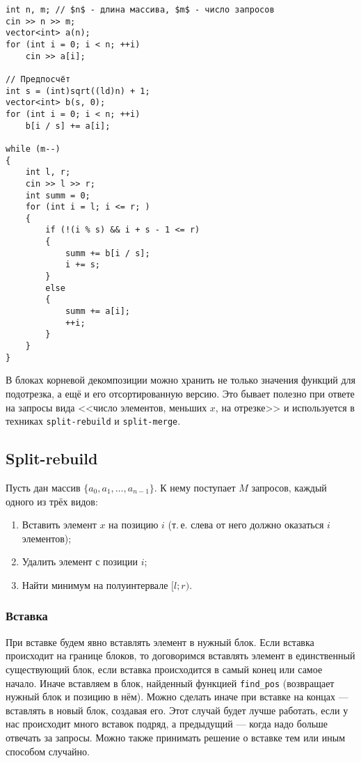 \begin{verbatim}
int n, m; // $n$ - длина массива, $m$ - число запросов
cin >> n >> m;
vector<int> a(n);
for (int i = 0; i < n; ++i)
    cin >> a[i];

// Предпосчёт
int s = (int)sqrt((ld)n) + 1;
vector<int> b(s, 0);
for (int i = 0; i < n; ++i)
    b[i / s] += a[i];

while (m--)
{
    int l, r;
    cin >> l >> r;
    int summ = 0;
    for (int i = l; i <= r; )
    {
        if (!(i % s) && i + s - 1 <= r)
        {
            summ += b[i / s];
            i += s;
        }
        else
        {
            summ += a[i];
            ++i;
        }
    }
}
\end{verbatim}

В блоках корневой декомпозиции можно хранить не только значения функций для подотрезка, а ещё и его отсортированную версию. Это бывает полезно при ответе на запросы вида <<число элементов, меньших $x$, на отрезке>> и используется в техниках \texttt{split-rebuild} и \texttt{split-merge}.

\subsection{Split-rebuild}

\begin{problem}
    Пусть дан массив $\{a_0, a_1, \ldots, a_{n - 1}\}$. К нему поступает $M$ запросов, каждый одного из трёх видов:

    \begin{enumerate}[nolistsep]
        \item Вставить элемент $x$ на позицию $i$ (т.\,е. слева от него должно оказаться $i$ элементов);
        \item Удалить элемент с позиции $i$;
        \item Найти минимум на полуинтервале $[l; r)$.
    \end{enumerate}
\end{problem}

\subsubsection{Вставка}

При вставке будем явно вставлять элемент в нужный блок. Если вставка происходит на границе блоков, то договоримся вставлять элемент в единственный существующий блок, если вставка происходится в самый конец или самое начало. Иначе вставляем в блок, найденный функцией \texttt{find\_pos} (возвращает нужный блок и позицию в нём). Можно сделать иначе при вставке на концах --- вставлять в новый блок, создавая его. Этот случай будет лучше работать, если у нас происходит много вставок подряд, а предыдущий --- когда надо больше отвечать за запросы. Можно также принимать решение о вставке тем или иным способом случайно.

